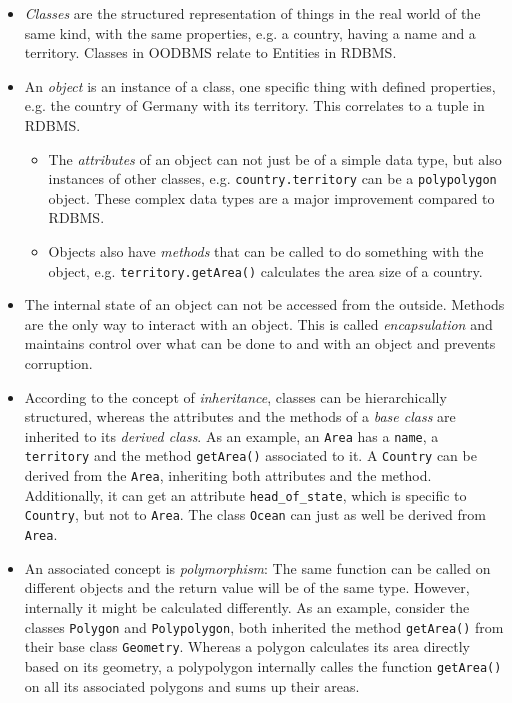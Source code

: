 \begin{itemize}
  \item \emph{Classes} are the structured representation of things in the real world of the same kind, with the same properties, e.g. a country, having a name and a territory. Classes in OODBMS relate to Entities in RDBMS.
  \item An \emph{object} is an instance of a class, one specific thing with defined properties, e.g. the country of Germany with its territory. This correlates to a tuple in RDBMS.
  \begin{itemize}
    \item The \emph{attributes} of an object can not just be of a simple data type, but also instances of other classes, e.g. \texttt{country.territory} can be a \texttt{polypolygon} object. These complex data types are a major improvement compared to RDBMS.
    \item Objects also have \emph{methods} that can be called to do something with the object, e.g. \texttt{territory.getArea()} calculates the area size of a country.
  \end{itemize}
  \item The internal state of an object can not be accessed from the outside. Methods are the only way to interact with an object. This is called \emph{encapsulation} and maintains control over what can be done to and with an object and prevents corruption.
  \item According to the concept of \emph{inheritance}, classes can be hierarchically structured, whereas the attributes and the methods of a \emph{base class} are inherited to its \emph{derived class}. As an example, an \texttt{Area} has a \texttt{name}, a \texttt{territory} and the method \texttt{getArea()} associated to it. A \texttt{Country} can be derived from the \texttt{Area}, inheriting both attributes and the method. Additionally, it can get an attribute \texttt{head\_of\_state}, which is specific to \texttt{Country}, but not to \texttt{Area}. The class \texttt{Ocean} can just as well be derived from \texttt{Area}.
  \item An associated concept is \emph{polymorphism}: The same function can be called on different objects and the return value will be of the same type. However, internally it might be calculated differently. As an example, consider the classes \texttt{Polygon} and \texttt{Polypolygon}, both inherited the method \texttt{getArea()} from their base class \texttt{Geometry}. Whereas a polygon calculates its area directly based on its geometry, a polypolygon internally calles the function \texttt{getArea()} on all its associated polygons and sums up their areas.
\end{itemize}

